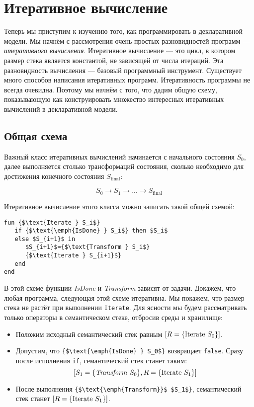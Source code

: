 \section{Итеративное вычисление}\label{iterative_computation}

Теперь мы приступим к изучению того, как программировать в декларативной модели. Мы начнём с рассмотрения очень простых разновидностей программ --- \emph{итеративного вычисления}. Итеративное вычисление --- это цикл, в котором размер стека является константой, не зависящей от числа итераций. Эта разновидность вычисления --- базовый программный инструмент. Существует много способов написания итеративных программ. Итеративность программы не всегда очевидна. Поэтому мы начнём с того, что дадим общую схему, показывающую как конструировать множество интересных итеративных вычислений в декларативной модели.

\subsection{Общая схема}\label{General_scheme}

Важный класс итеративных вычислений начинается с начального состояния $S_0$, далее выполняется столько трансформаций состояния, сколько необходимо для достижения конечного состояния $S_\text{final}$:

$$S_0 \to S_1 \to ... \to S_\text{final}$$

Итеративное вычисление этого класса можно записать такой общей схемой:

\begin{lstlisting}
fun {$\text{Iterate } S_i$}
   if {$\text{\emph{IsDone} } S_i$} then $S_i$
   else $S_{i+1}$ in
      $S_{i+1}$={$\text{Transform } S_i$}
      {$\text{Iterate } S_{i+1}$}
   end
end
\end{lstlisting}

В этой схеме функции \emph{IsDone} и \emph{Transform} зависят от задачи. Докажем, что любая программа, следующая этой схеме итеративна. Мы покажем, что размер стека не растёт при выполнении \lstinline!Iterate!. Для ясности мы будем рассматривать только операторы в семантическом стеке, отбросив среды и хранилище:

\begin{itemize}
\item{Положим исходный семантический стек равным $[R=\text{\lstinline|\{|Iterate } S_0 \text{\lstinline|\}|}]$.}

\item{Допустим, что \lstinline!{$\text{\emph{IsDone} } S_0$}! возвращает \lstinline!false!. Сразу после исполнения \lstinline!if!, семантический стек станет таким:
  $$[S_1=\text{\lstinline|\{|\emph{Transform} } S_0 \text{\lstinline|\}|}, R=\text{\lstinline|\{|Iterate } S_1 \text{\lstinline|\}|}]$$}

\item{После выполнения \lstinline|{$\text{\emph{Transform}}$ $S_1$}|, семантический стек станет $[R=\text{\lstinline|\{|Iterate } S_1 \text{\lstinline{\}}}]$.}
\end{itemize}

